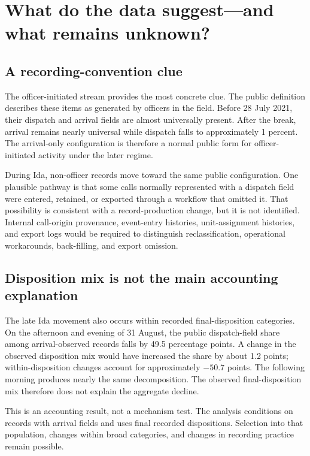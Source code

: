 \documentclass[11pt]{article}
\begin{document}
\section{What do the data suggest---and what remains unknown?}

\subsection{A recording-convention clue}

The officer-initiated stream provides the most concrete clue. The public definition describes these items as generated by officers in the field. Before 28 July 2021, their dispatch and arrival fields are almost universally present. After the break, arrival remains nearly universal while dispatch falls to approximately 1 percent. The arrival-only configuration is therefore a normal public form for officer-initiated activity under the later regime.

During Ida, non-officer records move toward the same public configuration. One plausible pathway is that some calls normally represented with a dispatch field were entered, retained, or exported through a workflow that omitted it. That possibility is consistent with a record-production change, but it is not identified. Internal call-origin provenance, event-entry histories, unit-assignment histories, and export logs would be required to distinguish reclassification, operational workarounds, back-filling, and export omission.

\subsection{Disposition mix is not the main accounting explanation}

The late Ida movement also occurs within recorded final-disposition categories. On the afternoon and evening of 31 August, the public dispatch-field share among arrival-observed records falls by 49.5 percentage points. A change in the observed disposition mix would have increased the share by about 1.2 points; within-disposition changes account for approximately $-50.7$ points. The following morning produces nearly the same decomposition. The observed final-disposition mix therefore does not explain the aggregate decline.

This is an accounting result, not a mechanism test. The analysis conditions on records with arrival fields and uses final recorded dispositions. Selection into that population, changes within broad categories, and changes in recording practice remain possible.
\end{document}
